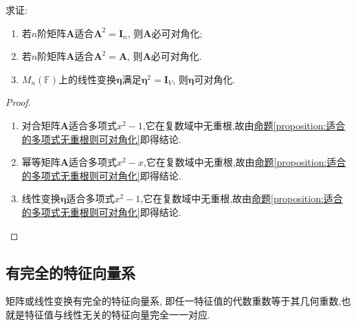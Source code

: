 \documentclass[../../main.tex]{subfiles}
\begin{document}
\begin{example}\label{example0.7qew}
求证:
\begin{enumerate}[(1)]
\item 若\(n\)阶矩阵\(\boldsymbol{A}\)适合\(\boldsymbol{A}^2 = \boldsymbol{I}_n\), 则\(\boldsymbol{A}\)必可对角化;

\item 若\(n\)阶矩阵\(\boldsymbol{A}\)适合\(\boldsymbol{A}^2 = \boldsymbol{A}\), 则\(\boldsymbol{A}\)必可对角化.

\item \(M_n(\mathbb{F})\)上的线性变换\(\boldsymbol{\eta}\)满足\(\boldsymbol{\eta}^2 = \boldsymbol{I}_V\), 则\(\boldsymbol{\eta}\)可对角化.
\end{enumerate}
\end{example}
\begin{proof}
\begin{enumerate}[(1)]
\item 对合矩阵\(\boldsymbol{A}\)适合多项式\(x^2 - 1\),它在复数域中无重根,故由\hyperref[proposition:适合的多项式无重根则可对角化]{命题\ref{proposition:适合的多项式无重根则可对角化}}即得结论.

\item 幂等矩阵\(\boldsymbol{A}\)适合多项式\(x^2 - x\),它在复数域中无重根,故由\hyperref[proposition:适合的多项式无重根则可对角化]{命题\ref{proposition:适合的多项式无重根则可对角化}}即得结论.

\item 线性变换\(\boldsymbol{\eta}\)适合多项式$x^2-1$,它在复数域中无重根,故由\hyperref[proposition:适合的多项式无重根则可对角化]{命题\ref{proposition:适合的多项式无重根则可对角化}}即得结论.
\end{enumerate}
\end{proof}


\subsection{有完全的特征向量系}

矩阵或线性变换有完全的特征向量系, 即任一特征值的代数重数等于其几何重数,也就是特征值与线性无关的特征向量完全一一对应.
\end{document}
